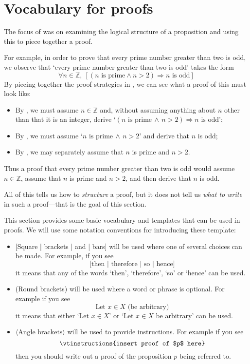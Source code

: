 \section{Vocabulary for proofs}
\label{secVocabulary}

The focus of  was on examining the logical structure of a proposition and using this to piece together a proof.

For example, in order to prove that every prime number greater than two is odd, we observe that `every prime number greater than two is odd' takes the form
\[ \forall n \in \mathbb{Z},~ [({n \text{ is prime}} \wedge {n > 2}) \Rightarrow {n \text{ is odd}}] \]
By piecing together the proof strategies in , we can see what a proof of this must look like:
\begin{itemize}
\item By , we must assume $n \in \mathbb{Z}$ and, without assuming anything about $n$ other than that it is an integer, derive `$({n \text{ is prime}} \,\wedge\, {n > 2}) \Rightarrow {n \text{ is odd}}$';
\item By , we must assume `${n \text{ is prime}} \,\wedge\, {n > 2}$' and derive that $n$ is odd;
\item By , we may separately assume that $n$ is prime and $n > 2$.
\end{itemize}
Thus a proof that every prime number greater than two is odd would assume $n \in \mathbb{Z}$, assume that $n$ is prime and $n>2$, and then derive that $n$ is odd.

All of this tells us how to \textit{structure} a proof, but it does not tell us \textit{what to write} in such a proof---that is the goal of this section.

This section provides some basic vocabulary and templates that can be used in proofs. We will use some notation conventions for introducing these template:
\begin{itemize}
\item{} [Square | brackets | and | bars] will be used where one of several choices can be made. For example, if you see
\[ \text{[then | therefore | so | hence]} \]
it means that any of the words `then', `therefore', `so' or `hence' can be used.
\item (Round brackets) will be used where a word or phrase is optional. For example if you see
\[ \text{Let $x \in X$ (be arbitrary)} \]
it means that either `Let $x \in X$' or `Let $x \in X$ be arbitrary' can be used.
\item $\langle\text{Angle brackets}\rangle$ will be used to provide instructions. For example if you see
\[ \text{\vtinstructions{insert proof of $p$ here}} \]
then you should write out a proof of the proposition $p$ being referred to.
\end{itemize}

